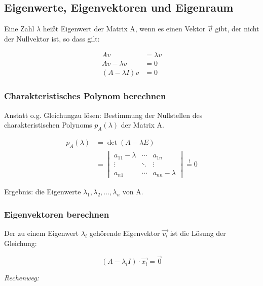 
\subsection{Eigenwerte, Eigenvektoren und Eigenraum}

Eine Zahl \(\lambda\) heißt Eigenwert der Matrix A, wenn es einen Vektor \(\vec{v}\) gibt, der nicht der Nullvektor ist, so dass gilt:

\begin{equation}
    \begin{split}
        A v &= \lambda v \\
        A v - \lambda v &= 0 \\
        (A - \lambda I) v &= 0
    \end{split}
\end{equation}


\subsubsection{Charakteristisches Polynom berechnen}
Anstatt o.g. Gleichungzu lösen: Bestimmung der Nullstellen des charakteristischen Polynoms \(p_A(\lambda)\) der Matrix A.

\begin{equation}
    \begin{split}
    p_A(\lambda) & = \det(A - \lambda E) \\
    & = \begin{vmatrix}
    a_{11} - \lambda & \cdots & a_{1n} \\
    \vdots & \ddots & \vdots \\
    a_{n1} & \cdots & a_{nn} - \lambda
    \end{vmatrix} \overset{!}{=} 0
    \end{split}
\end{equation}

Ergebnis: die Eigenwerte \(\lambda_1, \lambda_2, \dots, \lambda_n\) von A.

\subsubsection{Eigenvektoren berechnen}
Der zu einem Eigenwert \(\lambda_i\) gehörende Eigenvektor \(\vec{v_i}\) ist die Lösung der Gleichung:

\begin{equation}
    (A - \lambda_i I) \cdot \vec{x_i} = \vec{0}
\end{equation}

\textit{Rechenweg:}

